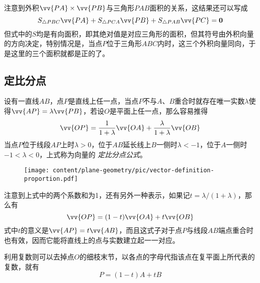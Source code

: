 \begin{example}
  注意到外积$\vv{PA}\times\vv{PB}$与三角形$PAB$面积的关系，这结果还可以写成
  \[ S_{\triangle PBC} \vv{PA} + S_{\triangle PCA} \vv{PB} + S_{\triangle PAB} \vv{PC} = \bm{0} \]
  但式中的$S$均是有向面积，即其绝对值是对应三角形的面积，但其符号由外积向量的方向决定，特别情况是，当点$P$位于三角形$ABC$内时，这三个外积向量同向，于是这里的三个面积就都是正的了。
\end{example}



\subsection{定比分点}
\label{sec:definition-proportion}

设有一直线$AB$，点$P$是直线上任一点，当点$P$不与$A$、$B$重合时就存在唯一实数$\lambda$使得$\vv{AP}=\lambda\vv{PB}$，若设$O$是平面上任一点，那么容易推得
\begin{equation}
  \label{eq:vector-definition-proportion}
  \vv{OP} = \frac{1}{1+\lambda} \vv{OA} + \frac{\lambda}{1+\lambda} \vv{OB}
\end{equation}
当点$P$位于线段$AP$上时$\lambda>0$，位于$AB$延长线上$B$一侧时$\lambda<-1$，位于$A$一侧时$-1<\lambda<0$，上式称为向量的 \emph{定比分点公式}。

\begin{figure}[htbp]
\centering
\texttt{[image: content/plane-geometry/pic/vector-definition-proportion.pdf]}
\caption{}
\label{fig:vector-definition-proportion}
\end{figure}

注意到上式中的两个系数和为1，还有另外一种表示，如果记$t= \lambda / (1+\lambda)$，那么有
\begin{equation}
  \label{eq:vector-definition-proportion-t}
  \vv{OP} = (1-t) \vv{OA} + t \vv{OB}
\end{equation}
式中$t$的意义是$\vv{AP} = t \vv{AB}$，而且这式子对于点$P$与线段$AB$端点重合时也有效，因而它能将直线上的点与实数建立起一一对应。

利用复数则可以去掉点$O$的细枝末节，以各点的字母代指该点在复平面上所代表的复数，就有
\begin{equation}
  \label{eq:complex-definition-proportion}
  P = (1-t)A + tB
\end{equation}

